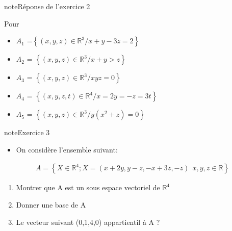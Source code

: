 \documentclass[letterpaper,10pt,french]{jupyterBook}
\begin{document}
\begin{sphinxadmonition}{note}{Réponse de l’exercice 2}

\sphinxAtStartPar
Pour
\begin{itemize}
\item {} 
\sphinxAtStartPar
\(A_1\) =\( \left\{ (x,y,z) \in \mathbb{R}^3 / x+y-3z = 2 \right\}\)

\item {} 
\sphinxAtStartPar
\(A_2\) =  \(\left\{ (x,y,z) \in \mathbb{R}^3 / x+y > z \right\}\)

\item {} 
\sphinxAtStartPar
\(A_3\) = \( \left\{ (x,y,z) \in \mathbb{R}^3 / xyz = 0 \right\}\)

\item {} 
\sphinxAtStartPar
\(A_4\) = \( \left\{ (x,y,z, t) \in \mathbb{R}^4 / x = 2y= -z=3t \right\}\)

\item {} 
\sphinxAtStartPar
\(A_5\) = \( \left\{ (x,y,z) \in \mathbb{R}^3 / y(x^2+z) = 0 \right\}\)

\end{itemize}
\end{sphinxadmonition}

\begin{sphinxadmonition}{note}{Exercice 3}
\begin{itemize}
\item {} 
\sphinxAtStartPar
On considère l’ensemble suivant:

\end{itemize}
\begin{equation*}
\begin{split}
A = \left\{ X \in \mathbb{R}^4 ; X= (x+2y,y-z, -x+3z,-z)~~ x,y,z \in \mathbb{R} \right\}
\end{split}
\end{equation*}\begin{enumerate}
%
\item {} 
\sphinxAtStartPar
Montrer que A est un sous espace vectoriel de \(\mathbb{R}^4\)

\item {} 
\sphinxAtStartPar
Donner une base de A

\item {} 
\sphinxAtStartPar
Le vecteur suivant (0,1,\sphinxhyphen{}4,0) appartient\sphinxhyphen{}il à A ? 

\end{enumerate}
\end{sphinxadmonition}
\end{document}
